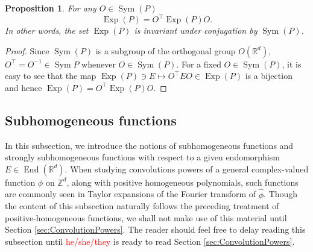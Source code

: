 \documentclass[11pt]{article}
\newtheorem{proposition}[theorem]{Proposition}
\theoremstyle{remark}
\newcommand\End{\operatorname{End}} %
\newcommand\OdR{\mbox{O}_d(\mathbb{R})} %
\newcommand\Sym{\operatorname{Sym}}
\newcommand\Exp{\operatorname{Exp}}
\begin{document}
\begin{proposition}\label{prop:ExpP}
For any  $O \in \Sym{(P)} $
\begin{equation*}
    \Exp(P) = O^\top \Exp(P) O.
\end{equation*}
In other words, the set $\Exp(P)$ is invariant under conjugation by $\Sym(P)$.
\end{proposition}

\begin{proof}
Since $\Sym(P)$ is a subgroup of the orthogonal group $O(\mathbb{R}^d)$, $O^\top = O^{-1} \in \Sym{P}$ whenever $O\in\Sym(P)$. For a fixed $O\in\Sym(P)$, it is easy to see that the map $\Exp(P)\ni E\mapsto  O^\top E O\in\Exp(P)$ is a bijection and hence $\Exp(P)=O^\top \Exp(P) O$. 
\end{proof}

\subsection{Subhomogeneous functions}\label{subsec:SubhomogeneousFunctions}
In this subsection, we introduce the notions of subhomogeneous functions and strongly subhomogeneous functions with respect to a given endomorphism $E\in\End(\mathbb{R}^d)$. When studying convolutions powers of a general complex-valued function $\phi$ on $\mathbb{Z}^d$, along with positive homogeneous polynomials, such functions are commonly seen in Taylor expansions of the Fourier transform of $\widehat{\phi}$. Though the content of this subsection naturally follows the preceding treatment of positive-homogeneous  functions, we shall not make use of this material until Section \ref{sec:ConvolutionPowers}. The reader should feel free to delay reading this subsection until \textcolor{red}{he/she/they} is ready to read Section \ref{sec:ConvolutionPowers}.
\end{document}
